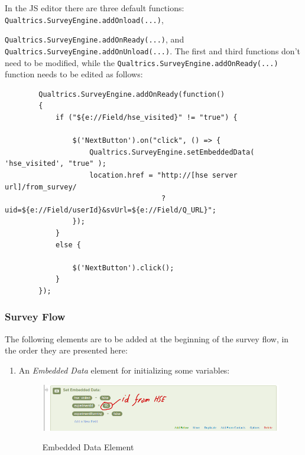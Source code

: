 \documentclass[a4paper]{usiinfbachelorproject}
\begin{document}
\begin{appendices}
        \newpage

        In the JS editor there are three default functions: \texttt{Qualtrics.SurveyEngine.addOnload(...)}, 

        \texttt{Qualtrics.SurveyEngine.addOnReady(...)},
        and \texttt{Qualtrics.SurveyEngine.addOnUnload(...)}. The first and third functions don't need to be modified, while the
        \texttt{Qualtrics.SurveyEngine.addOnReady(...)} function needs to be edited as follows:


        \begin{verbatim}
        Qualtrics.SurveyEngine.addOnReady(function()
        {
            if ("${e://Field/hse_visited}" != "true") {

                $('NextButton').on("click", () => {
                    Qualtrics.SurveyEngine.setEmbeddedData( 'hse_visited', "true" );
                    location.href = "http://[hse server url]/from_survey/ 
                                     ?uid=${e://Field/userId}&svUrl=${e://Field/Q_URL}";				   
                });
            }
            else {

                $('NextButton').click();					  
            }					  
        });
        \end{verbatim}

        \subsubsection{Survey Flow}

        The following elements are to be added at the beginning of the survey flow, in the order they are presented here:

        \begin{enumerate}

        \item
            An \emph{Embedded Data} element for initializing some variables:

            \begin{figure} [h]
            \centering
            \includegraphics[width=.9\textwidth]{figures/qflow1}
            \label{fig:qflow1} 
            \caption[]{Embedded Data Element}
            \end{figure}


\end{enumerate}
\end{appendices}
\end{document}
